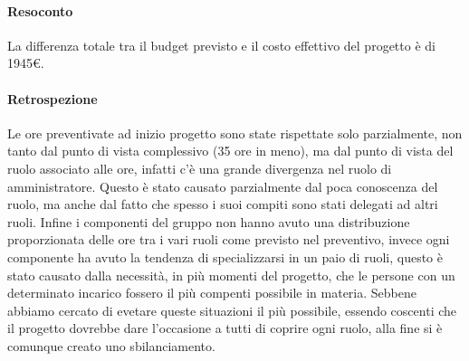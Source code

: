 \paragraph{Resoconto}
 La differenza totale tra il budget previsto e il costo effettivo del progetto è di 1945\euro.

\paragraph{Retrospezione}
Le ore preventivate ad inizio progetto sono state rispettate solo parzialmente, non tanto dal punto di vista complessivo (35 ore in meno), ma dal punto di vista del ruolo associato alle ore, infatti c'è una grande divergenza nel ruolo di amministratore. Questo è stato causato parzialmente dal poca conoscenza del ruolo, ma anche dal fatto che spesso i suoi compiti sono stati delegati ad altri ruoli.
Infine i componenti del gruppo non hanno avuto una distribuzione proporzionata delle ore tra i vari ruoli come previsto nel preventivo, invece ogni componente ha avuto la tendenza di specializzarsi in un paio di ruoli, questo è stato causato dalla necessità, in più momenti del progetto, che le persone con un determinato incarico fossero il più compenti possibile in materia. Sebbene abbiamo cercato di evetare queste situazioni il più possibile, essendo coscenti che il progetto dovrebbe dare l'occasione a tutti di coprire ogni ruolo, alla fine si è comunque creato uno sbilanciamento.
